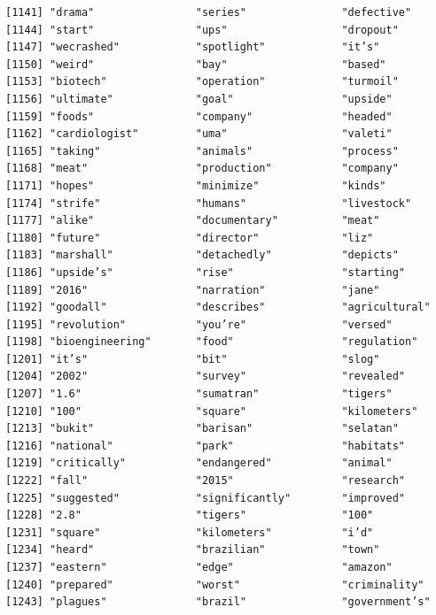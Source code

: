 \documentclass[
  letterpaper,
  DIV=11,
  numbers=noendperiod]{scrartcl}
\begin{document}
\begin{verbatim}
[1141] "drama"                "series"               "defective"           
[1144] "start"                "ups"                  "dropout"             
[1147] "wecrashed"            "spotlight"            "it’s"                
[1150] "weird"                "bay"                  "based"               
[1153] "biotech"              "operation"            "turmoil"             
[1156] "ultimate"             "goal"                 "upside"              
[1159] "foods"                "company"              "headed"              
[1162] "cardiologist"         "uma"                  "valeti"              
[1165] "taking"               "animals"              "process"             
[1168] "meat"                 "production"           "company"             
[1171] "hopes"                "minimize"             "kinds"               
[1174] "strife"               "humans"               "livestock"           
[1177] "alike"                "documentary"          "meat"                
[1180] "future"               "director"             "liz"                 
[1183] "marshall"             "detachedly"           "depicts"             
[1186] "upside’s"             "rise"                 "starting"            
[1189] "2016"                 "narration"            "jane"                
[1192] "goodall"              "describes"            "agricultural"        
[1195] "revolution"           "you’re"               "versed"              
[1198] "bioengineering"       "food"                 "regulation"          
[1201] "it’s"                 "bit"                  "slog"                
[1204] "2002"                 "survey"               "revealed"            
[1207] "1.6"                  "sumatran"             "tigers"              
[1210] "100"                  "square"               "kilometers"          
[1213] "bukit"                "barisan"              "selatan"             
[1216] "national"             "park"                 "habitats"            
[1219] "critically"           "endangered"           "animal"              
[1222] "fall"                 "2015"                 "research"            
[1225] "suggested"            "significantly"        "improved"            
[1228] "2.8"                  "tigers"               "100"                 
[1231] "square"               "kilometers"           "i’d"                 
[1234] "heard"                "brazilian"            "town"                
[1237] "eastern"              "edge"                 "amazon"              
[1240] "prepared"             "worst"                "criminality"         
[1243] "plagues"              "brazil"               "government’s"        

\end{verbatim}
\end{document}
